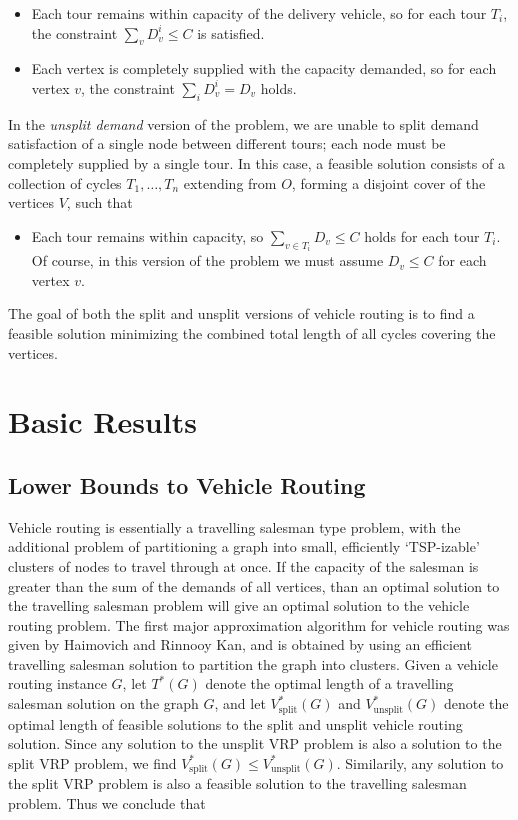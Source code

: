 \documentclass{article}
\theoremstyle{plain}
\newcommand{\VRPsplit}[1]{V^*_{\text{split}}( #1 )}
\newcommand{\VRPunsplit}[1]{V^*_{\text{unsplit}}( #1 )}
\begin{document}
%
\begin{itemize}
    \item Each tour remains within capacity of the delivery vehicle, so for each tour $T_i$, the constraint $\sum_v D^i_v \leq C$ is satisfied.

    \item Each vertex is completely supplied with the capacity demanded, so for each vertex $v$, the constraint $\sum_i D^i_v = D_v$ holds.
\end{itemize}
%
In the {\it unsplit demand} version of the problem, we are unable to split demand satisfaction of a single node between different tours; each node must be completely supplied by a single tour. In this case, a feasible solution consists of a collection of cycles $T_1, \dots, T_n$ extending from $O$, forming a disjoint cover of the vertices $V$, such that
%
\begin{itemize}
    \item Each tour remains within capacity, so $\sum_{v \in T_i} D_v \leq C$ holds for each tour $T_i$. Of course, in this version of the problem we must assume $D_v \leq C$ for each vertex $v$.
\end{itemize}
%
The goal of both the split and unsplit versions of vehicle routing is to find a feasible solution minimizing the combined total length of all cycles covering the vertices.

\section{Basic Results}

\subsection{Lower Bounds to Vehicle Routing}

Vehicle routing is essentially a travelling salesman type problem, with the additional problem of partitioning a graph into small, efficiently `TSP-izable' clusters of nodes to travel through at once. If the capacity of the salesman is greater than the sum of the demands of all vertices, than an optimal solution to the travelling salesman problem will give an optimal solution to the vehicle routing problem. The first major approximation algorithm for vehicle routing was given by Haimovich and Rinnooy Kan, and is obtained by using an efficient travelling salesman solution to partition the graph into clusters. Given a vehicle routing instance $G$, let $T^*(G)$ denote the optimal length of a travelling salesman solution on the graph $G$, and let $\VRPsplit{G}$ and $\VRPunsplit{G}$ denote the optimal length of feasible solutions to the split and unsplit vehicle routing solution. Since any solution to the unsplit VRP problem is also a solution to the split VRP problem, we find $\VRPsplit{G} \leq \VRPunsplit{G}$. Similarily, any solution to the split VRP problem is also a feasible solution to the travelling salesman problem. Thus we conclude that
\end{document}
